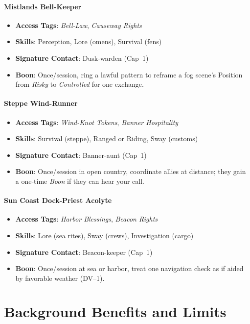 \begin{multicols}{2}
\paragraph{Mistlands Bell-Keeper}
\begin{itemize}
\item \textbf{Access Tags}: \textit{Bell-Law}, \textit{Causeway Rights}
\item \textbf{Skills}: Perception, Lore (omens), Survival (fens)
\item \textbf{Signature Contact}: Dusk-warden (Cap~1)
\item \textbf{Boon}: Once/session, ring a lawful pattern to reframe a fog scene’s Position from \emph{Risky} to \emph{Controlled} for one exchange.
\end{itemize}

\paragraph{Steppe Wind-Runner}
\begin{itemize}
\item \textbf{Access Tags}: \textit{Wind-Knot Tokens}, \textit{Banner Hospitality}
\item \textbf{Skills}: Survival (steppe), Ranged or Riding, Sway (customs)
\item \textbf{Signature Contact}: Banner-aunt (Cap~1)
\item \textbf{Boon}: Once/session in open country, coordinate allies at distance; they gain a one-time \emph{Boon} if they can hear your call.
\end{itemize}

\paragraph{Sun Coast Dock-Priest Acolyte}
\begin{itemize}
\item \textbf{Access Tags}: \textit{Harbor Blessings}, \textit{Beacon Rights}
\item \textbf{Skills}: Lore (sea rites), Sway (crews), Investigation (cargo)
\item \textbf{Signature Contact}: Beacon-keeper (Cap~1)
\item \textbf{Boon}: Once/session at sea or harbor, treat one navigation check as if aided by favorable weather (DV--1).
\end{itemize}

\section{Background Benefits and Limits}


\end{multicols}
